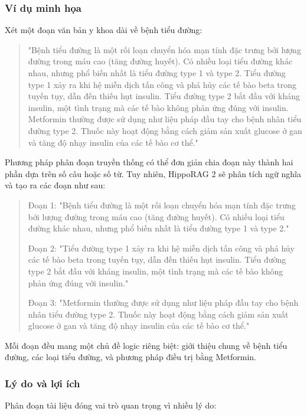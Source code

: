 \subsubsection{Ví dụ minh họa}
Xét một đoạn văn bản y khoa dài về bệnh tiểu đường:

\begin{quote}
"Bệnh tiểu đường là một rối loạn chuyển hóa mạn tính đặc trưng bởi lượng đường trong máu cao (tăng đường huyết). Có nhiều loại tiểu đường khác nhau, nhưng phổ biến nhất là tiểu đường type 1 và type 2. Tiểu đường type 1 xảy ra khi hệ miễn dịch tấn công và phá hủy các tế bào beta trong tuyến tụy, dẫn đến thiếu hụt insulin. Tiểu đường type 2 bắt đầu với kháng insulin, một tình trạng mà các tế bào không phản ứng đúng với insulin. Metformin thường được sử dụng như liệu pháp đầu tay cho bệnh nhân tiểu đường type 2. Thuốc này hoạt động bằng cách giảm sản xuất glucose ở gan và tăng độ nhạy insulin của các tế bào cơ thể."
\end{quote}

Phương pháp phân đoạn truyền thống có thể đơn giản chia đoạn này thành hai phần dựa trên số câu hoặc số từ. Tuy nhiên, HippoRAG 2 sẽ phân tích ngữ nghĩa và tạo ra các đoạn như sau:

\begin{quote}
Đoạn 1: "Bệnh tiểu đường là một rối loạn chuyển hóa mạn tính đặc trưng bởi lượng đường trong máu cao (tăng đường huyết). Có nhiều loại tiểu đường khác nhau, nhưng phổ biến nhất là tiểu đường type 1 và type 2."

Đoạn 2: "Tiểu đường type 1 xảy ra khi hệ miễn dịch tấn công và phá hủy các tế bào beta trong tuyến tụy, dẫn đến thiếu hụt insulin. Tiểu đường type 2 bắt đầu với kháng insulin, một tình trạng mà các tế bào không phản ứng đúng với insulin."

Đoạn 3: "Metformin thường được sử dụng như liệu pháp đầu tay cho bệnh nhân tiểu đường type 2. Thuốc này hoạt động bằng cách giảm sản xuất glucose ở gan và tăng độ nhạy insulin của các tế bào cơ thể."
\end{quote}

Mỗi đoạn đều mang một chủ đề logic riêng biệt: giới thiệu chung về bệnh tiểu đường, các loại tiểu đường, và phương pháp điều trị bằng Metformin.

\subsubsection{Lý do và lợi ích}
Phân đoạn tài liệu đóng vai trò quan trọng vì nhiều lý do:

